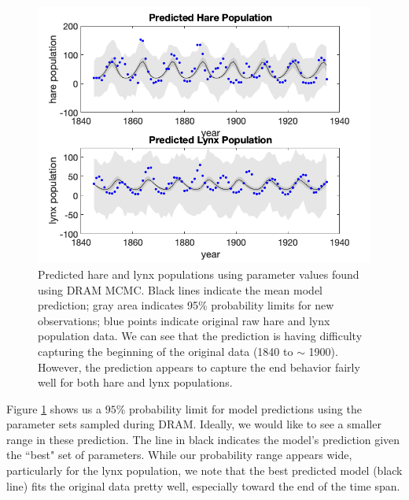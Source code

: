\begin{figure}[H]
    \centering
    \includegraphics[width=15cm]{MCMC_figs/final_dram_modpred.png}
    \caption{Predicted hare and lynx populations using parameter values found using DRAM MCMC. Black lines indicate the mean model prediction; gray area indicates 95$\%$ probability limits for new observations; blue points indicate original raw hare and lynx population data. We can see that the prediction is having difficulty capturing the beginning of the original data (1840 to $\sim$ 1900). However, the prediction appears to capture the end behavior fairly well for both hare and lynx populations.}
    \label{fig:10mcmc}
\end{figure}
Figure \ref{fig:10mcmc} shows us a $95\%$ probability limit for model predictions using the parameter sets sampled during DRAM. Ideally, we would like to see a smaller range in these prediction. The line in black indicates the model's prediction given the ``best" set of parameters. While our probability range appears wide, particularly for the lynx population, we note that the best predicted model (black line) fits the original data pretty well, especially toward the end of the time span.
